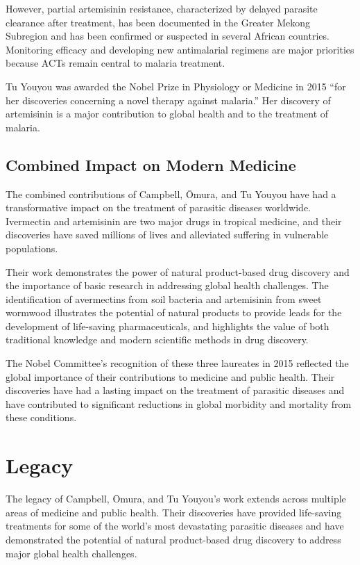 However, partial artemisinin resistance, characterized by delayed parasite clearance after treatment, has been documented in the Greater Mekong Subregion and has been confirmed or suspected in several African countries. Monitoring efficacy and developing new antimalarial regimens are major priorities because ACTs remain central to malaria treatment.

Tu Youyou was awarded the Nobel Prize in Physiology or Medicine in 2015 ``for her discoveries concerning a novel therapy against malaria.'' Her discovery of artemisinin is a major contribution to global health and to the treatment of malaria.

\subsection{Combined Impact on Modern Medicine}



The combined contributions of Campbell, \=Omura, and Tu Youyou have had a transformative impact on the treatment of parasitic diseases worldwide. Ivermectin and artemisinin are two major drugs in tropical medicine, and their discoveries have saved millions of lives and alleviated suffering in vulnerable populations.

Their work demonstrates the power of natural product-based drug discovery and the importance of basic research in addressing global health challenges. The identification of avermectins from soil bacteria and artemisinin from sweet wormwood illustrates the potential of natural products to provide leads for the development of life-saving pharmaceuticals, and highlights the value of both traditional knowledge and modern scientific methods in drug discovery.

The Nobel Committee's recognition of these three laureates in 2015 reflected the global importance of their contributions to medicine and public health. Their discoveries have had a lasting impact on the treatment of parasitic diseases and have contributed to significant reductions in global morbidity and mortality from these conditions.

\section{Legacy}

The legacy of Campbell, \=Omura, and Tu Youyou's work extends across multiple areas of medicine and public health. Their discoveries have provided life-saving treatments for some of the world's most devastating parasitic diseases and have demonstrated the potential of natural product-based drug discovery to address major global health challenges.

